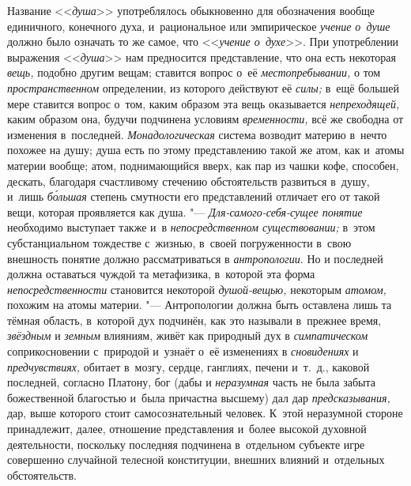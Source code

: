 Название <<{\em душа}>>
употреблялось обыкновенно для обозначения
вообще единичного, конечного духа, и~рациональное или эмпирическое
{\em учение о~душе}
должно было означать то же самое, что
<<{\em учение о~духе}>>.
При употреблении выражения
<<{\em душа}>> нам
предносится представление, что она есть некоторая
{\em вещь,} подобно
другим вещам; ставится вопрос о~её
{\em местопребывании,} о
том {\em пространственном}
определении, из которого действуют её
{\em силы;} в~ещё большей
мере ставится вопрос о~том, каким образом эта вещь оказывается
{\em непреходящей,} каким
образом она, будучи подчинена условиям
{\em временности,} всё же
свободна от изменения в~последней.
{\em Монадологическая}
система возводит материю в~нечто похожее на душу; душа есть
по этому представлению такой же атом, как и~атомы материи вообще; атом,
поднимающийся вверх, как пар из чашки кофе, способен, дескать, благодаря
счастливому стечению обстоятельств развиться в~душу, и~лишь
{\em б\'{о}льшая} степень
смутности его представлений отличает его от такой вещи, которая проявляется
как душа. "--- {\em Для-самого-себя-сущее
понятие} необходимо выступает также и~в
{\em непосредственном существовании;}
в~этом субстанциальном тождестве с~жизнью, в~своей
погруженности в~свою внешность понятие должно рассматриваться в
{\em антропологии}. Но и
последней должна оставаться чуждой та метафизика, в~которой эта форма
{\em непосредственности}
становится некоторой
{\em душой-вещью,}
некоторым {\em атомом,}
похожим на атомы материи. "--- Антропологии
должна быть оставлена лишь та тёмная область, в~которой дух подчинён, как
это называли в~прежнее время,
{\em звёздным} и
{\em земным} влияниям,
живёт как природный дух в
{\em симпатическом}
соприкосновении с~природой и~узнаёт о~её изменениях в
{\em сновидениях} и
{\em предчувствиях,}
обитает в~мозгу, сердце, ганглиях, печени и~т.~д., каковой
последней, согласно Платону, бог (дабы и
{\em неразумная} часть не
была забыта божественной благостью и~была причастна высшему) дал дар
{\em предсказывания,}
дар, выше которого стоит самосознательный человек. К~этой
неразумной стороне принадлежит, далее, отношение
представления и~более высокой духовной деятельности, поскольку последняя
подчинена в~отдельном субъекте игре совершенно случайной телесной
конституции, внешних влияний и~отдельных обстоятельств.

